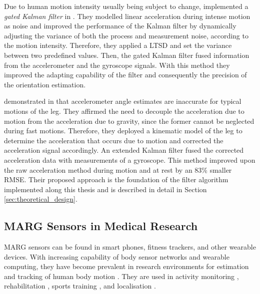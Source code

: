 Due to human motion intensity usually being subject to change, \citeauthor{olivares_vicente_signal_2013} implemented a \emph{gated Kalman filter} in \cite{olivares_vicente_signal_2013}. They modelled linear acceleration during intense motion as noise and improved the performance of the Kalman filter by dynamically adjusting the variance of both the process and measurement noise, according to the motion intensity. Therefore, they applied a \gls{LTSD} and set the variance between two predefined values. Then, the gated Kalman filter fused information from the accelerometer and the gyroscope signals. With this method they improved the adapting capability of the filter and consequently the precision of the orientation estimation.

\citeauthor{bennett_motion_2014} demonstrated in \cite{bennett_motion_2014} that accelerometer angle estimates are inaccurate for typical motions of the leg. They affirmed the need to decouple the acceleration due to motion from the acceleration due to gravity, since the former cannot be neglected during fast motions. Therefore, they deployed a kinematic model of the leg to determine the acceleration that occurs due to motion and corrected the acceleration signal accordingly. An extended Kalman filter fused the corrected acceleration data with measurements of a gyroscope. This method improved upon the raw acceleration method during motion and at rest by an 83\% smaller \gls{RMSE}. Their proposed approach is the foundation of the filter algorithm implemented along this thesis and is described in detail in Section \ref{sec:theoretical_design}.

\subsection{MARG Sensors in Medical Research}\label{sec:MARG_sensors_medical}

MARG sensors can be found in smart phones, fitness trackers, and other wearable devices. With increasing capability of body sensor networks and wearable computing, they have become prevalent in research environments for estimation and tracking of human body motion \cite{bennett_motion_2014}. They are used in activity monitoring \cite{veltink_detection_96}\cite{najafi_ambulatory_03}\cite{ermes_sports_08}, rehabilitation \cite{giggins_rehabilitation_13}\cite{lupinski_ligament_11}, sports training \cite{bonnet_squat_13}\cite{ermes_sports_08}, and localisation \cite{hoflinger_localization_13}\cite{Bennett_distance_13}.

